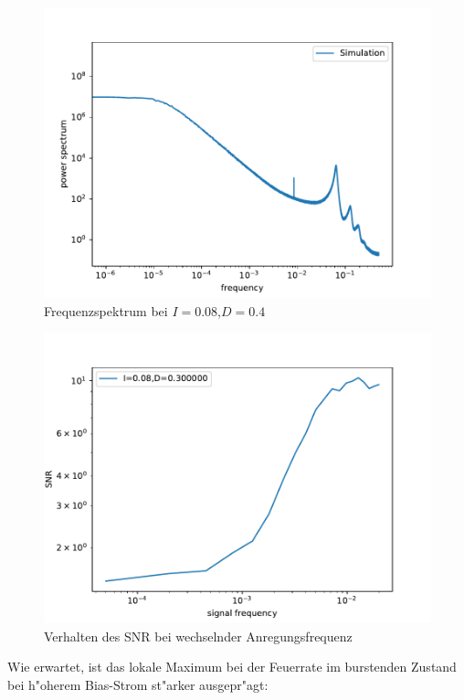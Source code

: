 \documentclass[12pt,a4paper]{article}
\begin{document}
\begin{figure}[H]
	\centering
	\includegraphics[scale=0.9]{inapikrealfrange26jj3013.pdf}
	\caption{Frequenzspektrum bei $I=0.08$,$D=0.4$}
	\label{snrdrange}
\end{figure}
\begin{figure}[H]
	\centering
	\includegraphics[scale=0.9]{snrfrange2.pdf}
	\caption{Verhalten des SNR bei wechselnder Anregungsfrequenz}
	\label{snfrange}
\end{figure}
Wie erwartet, ist das lokale Maximum bei der Feuerrate im burstenden Zustand bei h"oherem Bias-Strom st"arker ausgepr"agt:
\end{document}
